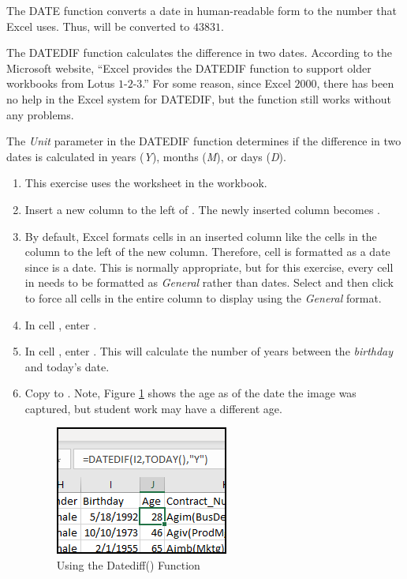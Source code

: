 The DATE function converts a date in human-readable form to the number that Excel uses. Thus,  will be converted to $ 43831 $.

The DATEDIF function calculates the difference in two dates. According to the Microsoft website, ``Excel provides the DATEDIF function to support older workbooks from Lotus $ 1 $-$ 2 $-$ 3 $.'' For some reason, since Excel $ 2000 $, there has been no help in the Excel system for DATEDIF, but the function still works without any problems. 

The \textit{Unit} parameter in the DATEDIF function determines if the difference in two dates is calculated in years (\textit{Y}), months (\textit{M}), or days (\textit{D}).

\begin{enumbox}
	\begin{enumerate}
		\item This exercise uses the  worksheet in the  workbook.
		\item Insert a new column to the left of . The newly inserted column becomes .
		\item By default, Excel formats cells in an inserted column like the cells in the column to the left of the new column. Therefore, cell  is formatted as a date since  is a date. This is normally appropriate, but for this exercise, every cell in  needs to be formatted as \textit{General} rather than dates. Select  and then click  to force all cells in the entire column to display using the \textit{General} format.
		\item In cell , enter .
		\item In cell , enter . This will calculate the number of years between the \textit{birthday} and today's date. 
		\item Copy  to . Note, Figure \ref{09:fig46} shows the age as of the date the image was captured, but student work may have a different age.
		
		\begin{figure}[H]
			\centering
			\includegraphics[width=\maxwidth{.50\linewidth}]{gfx/ch09_fig46}
			\caption{Using the Datediff() Function}
			\label{09:fig46}
		\end{figure}
		

\end{enumerate}
\end{enumbox}
